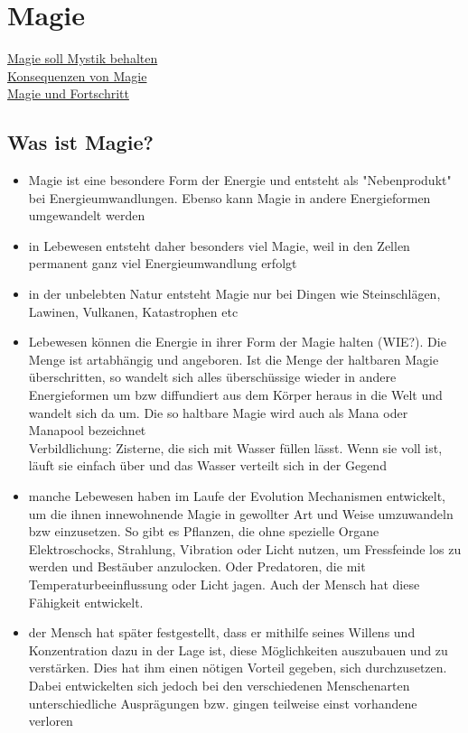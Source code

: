 \chapter{Magie}
\href{http://www.weltenbau-wissen.de/2015/12/magie-weltenbau-magiesystem-mystik-wissenschaft-teil-1/}{Magie soll Mystik behalten}\\
\href{http://www.weltenbau-wissen.de/2016/01/6-konsequenzen-magie/}{Konsequenzen von Magie}\\
\href{https://meisterperson.wordpress.com/2016/05/05/magie-fortschritt/?pk_campaign=pifeed&pk_kwd=magie-fortschritt}{Magie und Fortschritt}

\section{Was ist Magie?}
\begin{itemize}
	\item Magie ist eine besondere Form der Energie und entsteht als "Nebenprodukt" bei Energieumwandlungen. Ebenso kann Magie in andere Energieformen umgewandelt werden
	\item in Lebewesen entsteht daher besonders viel Magie, weil in den Zellen permanent ganz viel Energieumwandlung erfolgt
	\item in der unbelebten Natur entsteht Magie nur bei Dingen wie Steinschlägen, Lawinen, Vulkanen, Katastrophen etc
	\item Lebewesen können die Energie in ihrer Form der Magie halten (WIE?). Die Menge ist artabhängig und angeboren. Ist die Menge der haltbaren Magie überschritten, so wandelt sich alles überschüssige wieder in andere Energieformen um bzw diffundiert aus dem Körper heraus in die Welt und wandelt sich da um. Die so haltbare Magie wird auch als Mana oder Manapool bezeichnet \\
	Verbildlichung:  Zisterne, die sich mit Wasser füllen lässt. Wenn sie voll ist, läuft sie einfach über und das Wasser verteilt sich in der Gegend
	\item manche Lebewesen haben im Laufe der Evolution Mechanismen entwickelt, um die ihnen innewohnende Magie in gewollter Art und Weise umzuwandeln bzw einzusetzen. So gibt es Pflanzen, die ohne spezielle Organe Elektroschocks, Strahlung, Vibration oder Licht nutzen, um Fressfeinde los zu werden und Bestäuber anzulocken. Oder Predatoren, die mit Temperaturbeeinflussung oder Licht jagen. Auch der Mensch hat diese Fähigkeit entwickelt.
	\item der Mensch hat später festgestellt, dass er mithilfe seines Willens und Konzentration dazu in der Lage ist, diese Möglichkeiten auszubauen und zu verstärken. Dies hat ihm einen nötigen Vorteil gegeben, sich durchzusetzen. Dabei entwickelten sich jedoch bei den verschiedenen Menschenarten unterschiedliche Ausprägungen bzw. gingen teilweise einst vorhandene verloren

\end{itemize}

